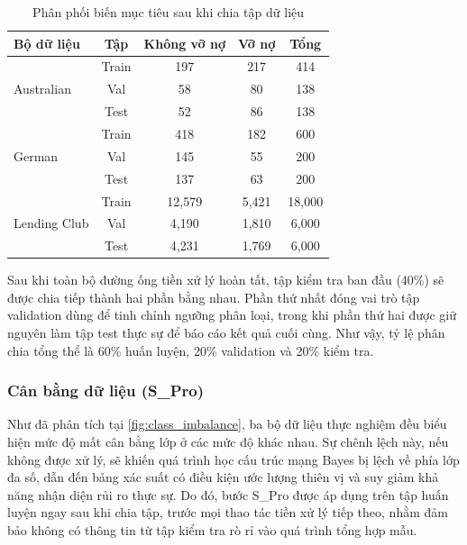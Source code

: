 \begin{table}[htbp]
    \centering
    \caption{Phân phối biến mục tiêu sau khi chia tập dữ liệu}
    \label{tab:train_test_split}
    \renewcommand{\arraystretch}{1.3} %
    \begin{tabular}{|l|c|c|c|c|}
        \hline
        \textbf{Bộ dữ liệu} & \textbf{Tập} & \textbf{Không vỡ nợ} & \textbf{Vỡ nợ} & \textbf{Tổng} \\ 
        \hline
        \multirow{3}{*}{Australian} 
        & Train & 197 & 217 & 414 \\ \cline{2-5}
        & Val & 58 & 80 & 138 \\ \cline{2-5}
        & Test  & 52 & 86 & 138 \\ 
        \hline
        \multirow{3}{*}{German} 
        & Train & 418 & 182 & 600 \\ \cline{2-5}
        & Val & 145 & 55 & 200 \\ \cline{2-5}
        & Test  & 137 & 63 & 200 \\ 
        \hline
        \multirow{3}{*}{Lending Club} 
        & Train & 12,579 & 5,421 & 18,000 \\ \cline{2-5}
        & Val & 4,190 & 1,810 & 6,000 \\ \cline{2-5}
        & Test  & 4,231  & 1,769 & 6,000 \\ 
        \hline
    \end{tabular}
\end{table}

Sau khi toàn bộ đường ống tiền xử lý hoàn tất, tập kiểm tra ban đầu (40\%) sẽ được chia tiếp thành hai phần bằng nhau. Phần thứ nhất đóng vai trò tập validation dùng để tinh chỉnh ngưỡng phân loại, trong khi phần thứ hai được giữ nguyên làm tập test thực sự để báo cáo kết quả cuối cùng. Như vậy, tỷ lệ phân chia tổng thể là 60\% huấn luyện, 20\% validation và 20\% kiểm tra.

\subsubsection{Cân bằng dữ liệu (S\_Pro)}
\noindent
Như đã phân tích tại \ref{fig:class_imbalance}, ba bộ dữ liệu thực nghiệm đều biểu hiện mức độ mất cân bằng lớp ở các mức độ khác nhau. Sự chênh lệch này, nếu không được xử lý, sẽ khiến quá trình học cấu trúc mạng Bayes bị lệch về phía lớp đa số, dẫn đến bảng xác suất có điều kiện ước lượng thiên vị và suy giảm khả năng nhận diện rủi ro thực sự. Do đó, bước S\_Pro được áp dụng trên tập huấn luyện ngay sau khi chia tập, trước mọi thao tác tiền xử lý tiếp theo, nhằm đảm bảo không có thông tin từ tập kiểm tra rò rỉ vào quá trình tổng hợp mẫu.

